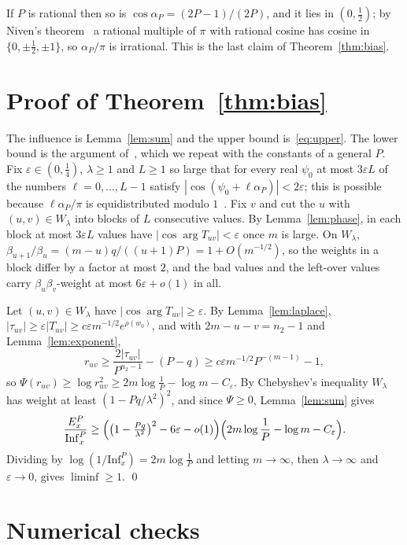 \documentclass[11pt]{amsart}
\theoremstyle{remark}
\newcommand{\Inf}{\mathrm{Inf}}
\begin{document}
If $P$ is rational then so is $\cos\alpha_P=(2P-1)/(2P)$, and it lies in $(0,\frac12)$; by Niven's
theorem~\cite{Niv} a rational multiple of $\pi$ with rational cosine has cosine in $\{0,\pm\frac12,\pm1\}$, so
$\alpha_P/\pi$ is irrational. This is the last claim of Theorem~\ref{thm:bias}.

\section{Proof of Theorem~\ref{thm:bias}}\label{sec:proof}

The influence is Lemma~\ref{lem:sum} and the upper bound is~\eqref{eq:upper}. The lower bound is the argument
of~\cite[Section~4]{Shm9}, which we repeat with the constants of a general $P$. Fix $\varepsilon\in(0,\frac14)$,
$\lambda\ge1$ and $L\ge1$ so large that for every real $\psi_0$ at most $3\varepsilon L$ of the numbers
$\ell=0,\dots,L-1$ satisfy $|\cos(\psi_0+\ell\alpha_P)|<2\varepsilon$; this is possible because $\ell\alpha_P/\pi$ is
equidistributed modulo $1$~\cite{Weyl16}. Fix $v$ and cut the $u$ with $(u,v)\in W_\lambda$ into blocks of $L$
consecutive values. By Lemma~\ref{lem:phase}, in each block at most $3\varepsilon L$ values have
$|\cos\arg T_{uv}|<\varepsilon$ once $m$ is large. On $W_\lambda$, $\beta_{u+1}/\beta_u=(m-u)q/((u+1)P)=1+O(m^{-1/2})$,
so the weights in a block differ by a factor at most $2$, and the bad values and the left-over values carry
$\beta_u\beta_v$-weight at most $6\varepsilon+o(1)$ in all.

Let $(u,v)\in W_\lambda$ have $|\cos\arg T_{uv}|\ge\varepsilon$. By Lemma~\ref{lem:laplace},
$|\tau_{uv}|\ge\varepsilon|T_{uv}|\ge c\varepsilon m^{-1/2}e^{\rho(w_0)}$, and with $2m-u-v=n_2-1$ and
Lemma~\ref{lem:exponent},
\[
r_{uv}\ge\frac{2|\tau_{uv}|}{P^{n_2-1}}-(P-q)\ge c\varepsilon m^{-1/2}P^{-(m-1)}-1 ,
\]
so $\Psi(r_{uv})\ge\log r_{uv}^2\ge2m\log\frac1P-\log m-C_\varepsilon$. By Chebyshev's inequality $W_\lambda$ has weight
at least $(1-Pq/\lambda^2)^2$, and since $\Psi\ge0$, Lemma~\ref{lem:sum} gives
\[
\frac{E_x^P}{\Inf_x^P}\ge\Bigl(\bigl(1-\tfrac{Pq}{\lambda^2}\bigr)^2-6\varepsilon-o(1)\Bigr)\Bigl(2m\log\frac1P-\log m-C_\varepsilon\Bigr).
\]
Dividing by $\log(1/\Inf_x^P)=2m\log\frac1P$ and letting $m\to\infty$, then $\lambda\to\infty$ and $\varepsilon\to0$,
gives $\liminf\ge1$. \qed

\section{Numerical checks}\label{sec:num}
\end{document}

